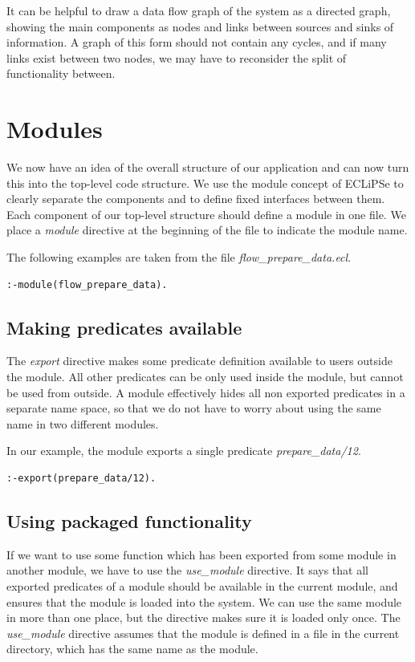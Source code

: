 \documentclass[a4paper,12pt]{report}
\begin{document}
It can be helpful to draw a data flow graph of the system as a directed graph, showing the main components as nodes and links between sources and sinks of information. A graph of this form should not contain any cycles, and if many links exist between two nodes, we may have to reconsider the split of functionality between. 

\section{Modules}
We now have an idea of the overall structure of our application and can now turn this into the top-level code structure. We use the module concept of ECLiPSe to clearly separate the components and to define fixed interfaces between them. Each component of our top-level structure should define a module in one file. We place a {\it module} directive at the beginning of the file to indicate the module name. 

The following examples are taken from the file {\it flow\_prepare\_data.ecl}.
\begin{verbatim}
:-module(flow_prepare_data).
\end{verbatim}

\subsection{Making predicates available}
The {\it export} directive makes some predicate definition available to users outside the module. All other predicates can be only used inside the module, but cannot be used from outside. A module effectively hides all non exported predicates in a separate name space, so that we do not have to worry about using the same name in two different modules. 

In our example, the module exports a single predicate {\it prepare\_data/12}.
\begin{verbatim}
:-export(prepare_data/12).
\end{verbatim}

\subsection{Using packaged functionality}
If we want to use some function which has been exported from some module in another module, we have to use the {\it use\_module} directive. It says that all exported predicates of a module should be available in the current module, and ensures that the module is loaded into the system. We can use the same module in more than one place, but the directive makes sure it is loaded only once. The {\it use\_module} directive assumes that the module is defined in a file in the current directory, which has the same name as the module. 
\end{document}
